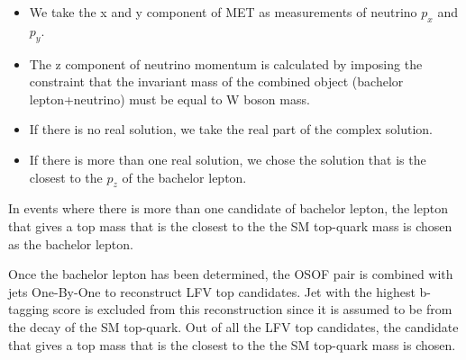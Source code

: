\begin{itemize}
\item We take the x and y component of MET as measurements of neutrino $p_x$ and $p_y$. 
\item The z component of neutrino momentum is calculated by imposing the constraint that the invariant mass of the combined object (bachelor lepton+neutrino) must be equal to W boson mass.
\item If there is no real solution, we take the real part of the complex solution.
\item If there is more than one real solution, we chose the solution that is the closest to the $p_z$ of the bachelor lepton.
\end{itemize}

In events where there is more than one candidate of bachelor lepton, the lepton that gives a top mass that is the closest to the the SM top-quark mass is chosen as the bachelor lepton.

Once the bachelor lepton has been determined, the OSOF pair is combined with jets One-By-One to reconstruct LFV top candidates. Jet with the highest b-tagging score is excluded from this reconstruction since it is assumed to be from the decay of the SM top-quark. Out of all the LFV top candidates, the candidate that gives a top mass that is the closest to the the SM top-quark mass is chosen.

